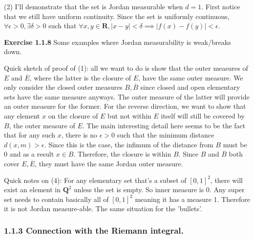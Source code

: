 \documentclass[answers,12pt]{exam}
\begin{document}
\begin{solution}
(2) I'll demonstrate that the set is Jordan measurable when $d=1$.
First notice that we still have uniform continuity.
Since the set is uniformly continuous, $\forall \epsilon > 0, \exists \delta > 0$ such that $\forall x,y \in \mathbf{R}, |x-y| < \delta \implies |f(x)-f(y)| < \epsilon$.
\end{solution}

\textbf{Exercise 1.1.8} Some examples where Jordan measurability is weak/breaks down.
\begin{solution}
    Quick sketch of proof of (1): all we want to do is show that the outer measures of $E$ and $\overline{E}$, where the latter is the closure of $E$, have the same outer measure.
    We only consider the closed outer measures $B, \overline{B}$ since closed and open elementary sets have the same measure anyways.
    The outer measure of the latter will provide an outer measure for the former.
    For the reverse direction, we want to show that any element $x$ on the closure of $E$ but not within $E$ itself will still be covered by $B$, the outer measure of $E$.
    The main interesting detail here seems to be the fact that for any such $x$, there is no $\epsilon >0$ such that the minimum distance $d(x, m)>\epsilon$.
    Since this is the case, the infimum of the distance from $B$ must be 0 and as a result $x \in B$.
    Therefore, the closure is within $B$.
    Since $B$ and $\overline{B}$ both cover $E, \overline{E}$, they must have the same Jordan outer measure.

    Quick notes on (4): For any elementary set that's a subset of $[0,1]^2$, there will exist an element in $\mathbf{Q}^2$ unless the set is empty. 
    So inner measure is 0.
    Any super set needs to contain basically all of $[0,1]^2$ meaning it has a measure 1.
    Therefore it is not Jordan measure-able.
    The same situation for the 'bullets'.
\end{solution}

\subsubsection{1.1.3 Connection with the Riemann integral.}
\end{document}
